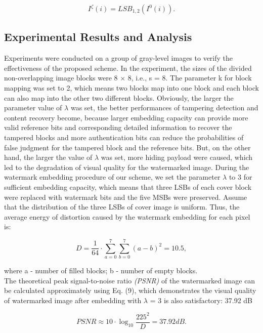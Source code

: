 \documentclass[a4paper, 12pt]{gji}
\begin{document}
\begin{equation}
I^\zeta(i) =  LSB_{1,2}(I^0(i)).
\end{equation}

\subsection{Experimental Results and Analysis}

Experiments were conducted on a group of gray-level images to verify the effectiveness of the proposed scheme. In the experiment, the sizes of the divided non-overlapping image blocks were 8 $\times$ 8, i.e., s = 8. The parameter k for block mapping was set to 2, which means two blocks map into one block and each block can also map into the other two different blocks. Obviously, the larger the parameter value of $\lambda$ was set, the better performances of tampering detection and content recovery become, because larger embedding capacity can provide more valid reference bits and corresponding detailed information to recover the tampered blocks and more authentication bits can reduce the probabilities of false judgment for the tampered block and the reference bits. But, on the other hand, the larger the value of $\lambda$ was set, more hiding payload were caused, which led to the degradation of visual quality for the watermarked image. During the watermark embedding procedure of our scheme, we set the parameter $\lambda$ to 3 for sufficient embedding capacity, which means that three LSBs of each cover block were replaced with watermark bits and the five MSBs were preserved. Assume that the distribution of the three LSBs of cover image is uniform. Thus, the average energy of distortion caused by the watermark embedding for each pixel is:

\begin{equation}
D =  \frac{1}{64} \cdot \sum_{a=0}^{7}\sum_{b=0}^{7}(a-b)^2 = 10.5,\label{eq:01}
\end{equation}

where a - number of filled blocks;
b - number of empty blocks.\\

The theoretical peak signal-to-noise ratio \textit{(PSNR)} of the watermarked image can be calculated approximately using Eq. (9), which demonstrates the visual quality of watermarked image after embedding with $\lambda$ = 3 is also satisfactory: 37.92 dB

\begin{equation}
\textit{PSNR} \approx 10\cdot \log_{10}{\frac{225^2}{D}}=37.92dB.\label{eq:02}
\end{equation}
\end{document}

